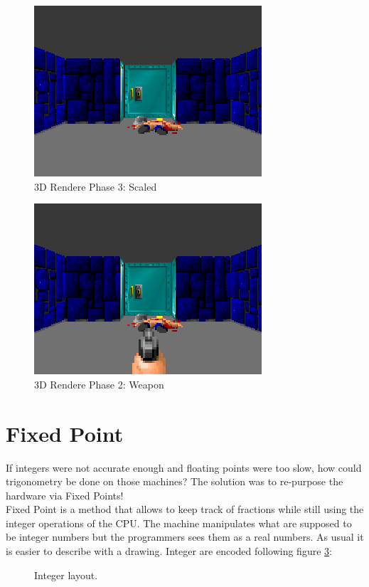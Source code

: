 \documentclass[book.tex]{subfiles}
\begin{document}
 
 \begin{figure}[H]
\centering
 \includegraphics[scale=1.3]{screenshots/wolf3d_6_scaled}
 \caption{3D Rendere Phase 3: Scaled} \label{fig:mips}
 \end{figure}

 \begin{figure}[H]
\centering
 \includegraphics[scale=1.3]{screenshots/wolf3d_7_fullframe.png}
 \caption{3D Rendere Phase 2: Weapon} \label{fig:mips}
 \end{figure}
 

   
   
\section{Fixed Point}

 
If integers were not accurate enough and floating points were too slow, how could trigonometry be done on those machines? The solution was to re-purpose the hardware via Fixed Points!\\
Fixed Point is a method that allows to keep track of fractions while still using the integer operations of the CPU. The machine manipulates what are supposed to be integer numbers but the programmers sees them as a real numbers. As usual it is easier to describe with a drawing. Integer are encoded following figure \ref{fig:int_layout}:
\begin{figure}[H]
\centering
 
 \caption{Integer layout.} \label{fig:int_layout}
 \end{figure}
\end{document}
